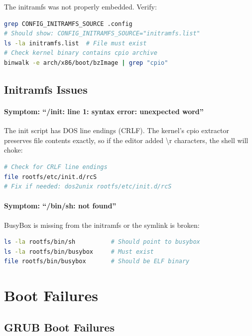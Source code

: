 The initramfs was not properly embedded. Verify:

\begin{lstlisting}[language=bash]
grep CONFIG_INITRAMFS_SOURCE .config
# Should show: CONFIG_INITRAMFS_SOURCE="initramfs.list"
ls -la initramfs.list  # File must exist
# Check kernel binary contains cpio archive
binwalk -e arch/x86/boot/bzImage | grep "cpio"
\end{lstlisting}

\subsection{Initramfs Issues}

\paragraph{Symptom: ``/init: line 1: syntax error: unexpected word''}

The init script has DOS line endings (CRLF). The kernel's cpio extractor
preserves file contents exactly, so if the editor added \textbackslash r
characters, the shell will choke:

\begin{lstlisting}[language=bash]
# Check for CRLF line endings
file rootfs/etc/init.d/rcS
# Fix if needed: dos2unix rootfs/etc/init.d/rcS
\end{lstlisting}

\paragraph{Symptom: ``/bin/sh: not found''}

BusyBox is missing from the initramfs or the symlink is broken:

\begin{lstlisting}[language=bash]
ls -la rootfs/bin/sh          # Should point to busybox
ls -la rootfs/bin/busybox     # Must exist
file rootfs/bin/busybox       # Should be ELF binary
\end{lstlisting}

\section{Boot Failures}

\subsection{GRUB Boot Failures}

